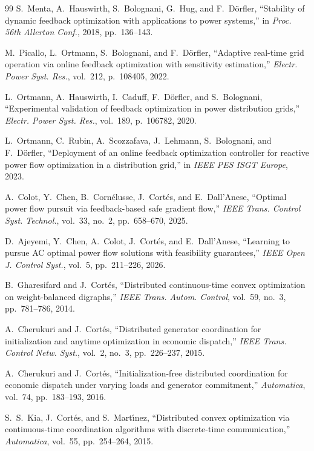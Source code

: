 \documentclass[11pt,onecolumn]{article}
\theoremstyle{definition}
\theoremstyle{remark}
\begin{document}
\begin{thebibliography}{99}
S.~Menta, A.~Hauswirth, S.~Bolognani, G.~Hug, and F.~D\"{o}rfler, ``Stability of dynamic feedback optimization with applications to power systems,'' in \emph{Proc. 56th Allerton Conf.}, 2018, pp.~136--143.

M.~Picallo, L.~Ortmann, S.~Bolognani, and F.~D\"{o}rfler, ``Adaptive real-time grid operation via online feedback optimization with sensitivity estimation,'' \emph{Electr. Power Syst. Res.}, vol.~212, p.~108405, 2022.

L.~Ortmann, A.~Hauswirth, I.~Caduff, F.~D\"{o}rfler, and S.~Bolognani, ``Experimental validation of feedback optimization in power distribution grids,'' \emph{Electr. Power Syst. Res.}, vol.~189, p.~106782, 2020.

L.~Ortmann, C.~Rubin, A.~Scozzafava, J.~Lehmann, S.~Bolognani, and F.~D\"{o}rfler, ``Deployment of an online feedback optimization controller for reactive power flow optimization in a distribution grid,'' in \emph{IEEE PES ISGT Europe}, 2023.

A.~Colot, Y.~Chen, B.~Corn\'{e}lusse, J.~Cort\'{e}s, and E.~Dall'Anese, ``Optimal power flow pursuit via feedback-based safe gradient flow,'' \emph{IEEE Trans. Control Syst. Technol.}, vol.~33, no.~2, pp.~658--670, 2025.

D.~Ajeyemi, Y.~Chen, A.~Colot, J.~Cort\'{e}s, and E.~Dall'Anese, ``Learning to pursue AC optimal power flow solutions with feasibility guarantees,'' \emph{IEEE Open J. Control Syst.}, vol.~5, pp.~211--226, 2026.

B.~Gharesifard and J.~Cort\'{e}s, ``Distributed continuous-time convex optimization on weight-balanced digraphs,'' \emph{IEEE Trans. Autom. Control}, vol.~59, no.~3, pp.~781--786, 2014.

A.~Cherukuri and J.~Cort\'{e}s, ``Distributed generator coordination for initialization and anytime optimization in economic dispatch,'' \emph{IEEE Trans. Control Netw. Syst.}, vol.~2, no.~3, pp.~226--237, 2015.

A.~Cherukuri and J.~Cort\'{e}s, ``Initialization-free distributed coordination for economic dispatch under varying loads and generator commitment,'' \emph{Automatica}, vol.~74, pp.~183--193, 2016.

S.~S.~Kia, J.~Cort\'{e}s, and S.~Mart\'{\i}nez, ``Distributed convex optimization via continuous-time coordination algorithms with discrete-time communication,'' \emph{Automatica}, vol.~55, pp.~254--264, 2015.


\end{thebibliography}
\end{document}
